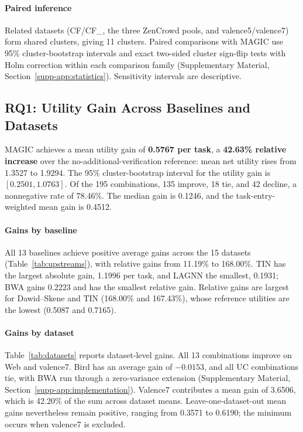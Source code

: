 \documentclass[journal]{IEEEtran}
\begin{document}
\paragraph{Paired inference}
Related datasets (CF/CF\_, the three ZenCrowd pools, and valence5/valence7) form shared clusters, giving 11 clusters. Paired comparisons with MAGIC use 95\% cluster-bootstrap intervals and exact two-sided cluster sign-flip tests with Holm correction within each comparison family (Supplementary Material, Section~\ref{supp-app:statistics}). Sensitivity intervals are descriptive.

\subsection{RQ1: Utility Gain Across Baselines and Datasets}
MAGIC achieves a mean utility gain of \textbf{0.5767 per task}, a \textbf{42.63\% relative increase} over the no-additional-verification reference: mean net utility rises from 1.3527 to 1.9294. The 95\% cluster-bootstrap interval for the utility gain is $[0.2501,1.0763]$. Of the 195 combinations, 135 improve, 18 tie, and 42 decline, a nonnegative rate of 78.46\%. The median gain is 0.1246, and the task-entry-weighted mean gain is 0.4512.

\paragraph{Gains by baseline}
All 13 baselines achieve positive average gains across the 15 datasets (Table~\ref{tab:upstreams}), with relative gains from 11.19\% to 168.00\%. TIN has the largest absolute gain, 1.1996 per task, and LAGNN the smallest, 0.1931; BWA gains 0.2223 and has the smallest relative gain. Relative gains are largest for Dawid--Skene and TIN (168.00\% and 167.43\%), whose reference utilities are the lowest (0.5087 and 0.7165).

\paragraph{Gains by dataset}
Table~\ref{tab:datasets} reports dataset-level gains. All 13 combinations improve on Web and valence7. Bird has an average gain of $-0.0153$, and all UC combinations tie, with BWA run through a zero-variance extension (Supplementary Material, Section~\ref{supp-app:implementation}). Valence7 contributes a mean gain of 3.6506, which is 42.20\% of the sum across dataset means. Leave-one-dataset-out mean gains nevertheless remain positive, ranging from 0.3571 to 0.6190; the minimum occurs when valence7 is excluded.
\end{document}
